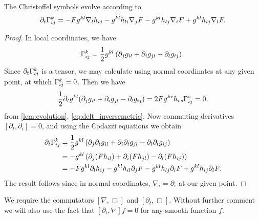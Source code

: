 \documentclass{amsart}
\begin{document}
\begin{lemma}
\label{EvGamma}
The Christoffel symbols evolve according to
\begin{equation}
\partial_t {\Gamma}^{k}_{ij} = -F g^{kl} \nabla_l h_{ij} - g^{kl} h_{li} \nabla_j F - g^{kl} h_{lj} \nabla_i F + g^{kl} h_{ij} \nabla_l F.
\end{equation}
\end{lemma}

\begin{proof}
In local coordinates, we have
\[
\Gamma^{k}_{ij} = \frac{1}{2} g^{kl} \left(\partial_j g_{il} + \partial_i g_{jl} - \partial_l g_{ij}\right).
\]
Since $\partial_t \Gamma^{k}_{ij}$ is a tensor, we may calculate using normal coordinates at any given point, at which \(\Gamma^k_{ij} = 0\). Then we have
\[
\frac{1}{2} \partial_t g^{kl} (\partial_j g_{il} + \partial_i g_{jl} - \partial_l g_{ij}) = 2F g^{kr} h_{rs} \Gamma^s_{ij} = 0.
\]
from \cref{lem:evolution}, \cref{eq:delt_inversemetric}. Now commuting derivatives \([\partial_t, \partial_i] = 0\), and using the Codazzi equations we obtain
\[
\begin{split}
\partial_t {\Gamma}^{k}_{ij} & = \frac{1}{2} g^{kl} \left(\partial_j \partial_t g_{il} + \partial_i \partial_t g_{jl} - \partial_l \partial_t g_{ij}\right) \\
&= - g^{kl} \left(\partial_j (F h_{il}) + \partial_i (F h_{jl}) - \partial_l (F h_{ij})\right) \\
&= -F g^{kl} \partial_l h_{ij} - g^{kl} h_{il} \partial_j F  - g^{kl} h_{lj} \partial_i F + g^{kl} h_{ij} \partial_l F.
\end{split}
\]
The result follows since in normal coordinates, \(\nabla_i = \partial_i\) at our given point.
\end{proof}

We require the commutators \([\nabla, \Box]\) and \([\partial_t, \Box]\). Without further comment we will also use the fact that \([\partial_t, \nabla] f = 0\) for any smooth function \(f\).
\end{document}
